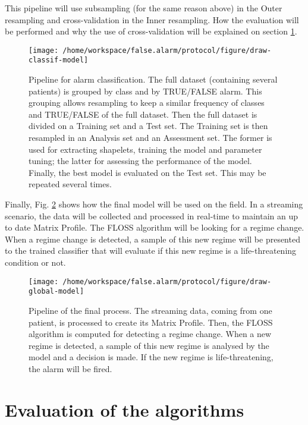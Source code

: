 \documentclass[12pt,twoside]{fmupthesis}
\begin{document}
This pipeline will use subsampling (for the same reason above) in the Outer resampling and
cross-validation in the Inner resampling. How the evaluation will be performed and why the use of
cross-validation will be explained on section \ref{evaluation}.
\begin{figure}

{\centering \texttt{[image: /home/workspace/false.alarm/protocol/figure/draw-classif-model]} 

}

\caption{Pipeline for alarm classification. The full dataset (containing several patients) is grouped by class and by TRUE/FALSE alarm. This grouping allows resampling to keep a similar frequency of classes and TRUE/FALSE of the full dataset. Then the full dataset is divided on a Training set and a Test set. The Training set is then resampled in an Analysis set and an Assessment set. The former is used for extracting shapelets, training the model and parameter tuning; the latter for assessing the performance of the model. Finally, the best model is evaluated on the Test set. This may be repeated several times.}\label{fig:shapelets}
\end{figure}
Finally, Fig. \ref{fig:fullmodel} shows how the final model will be used on the field. In a
streaming scenario, the data will be collected and processed in real-time to maintain an up to date
Matrix Profile. The FLOSS algorithm will be looking for a regime change. When a regime change is
detected, a sample of this new regime will be presented to the trained classifier that will evaluate
if this new regime is a life-threatening condition or not.
\begin{figure}

{\centering \texttt{[image: /home/workspace/false.alarm/protocol/figure/draw-global-model]} 

}

\caption{Pipeline of the final process. The streaming data, coming from one patient, is processed to create its Matrix Profile. Then, the FLOSS algorithm is computed for detecting a regime change. When a new regime is detected, a sample of this new regime is analysed by the model and a decision is made. If the new regime is life-threatening, the alarm will be fired.}\label{fig:fullmodel}
\end{figure}
\hypertarget{evaluation}{%
\section{Evaluation of the algorithms}\label{evaluation}}
\end{document}
